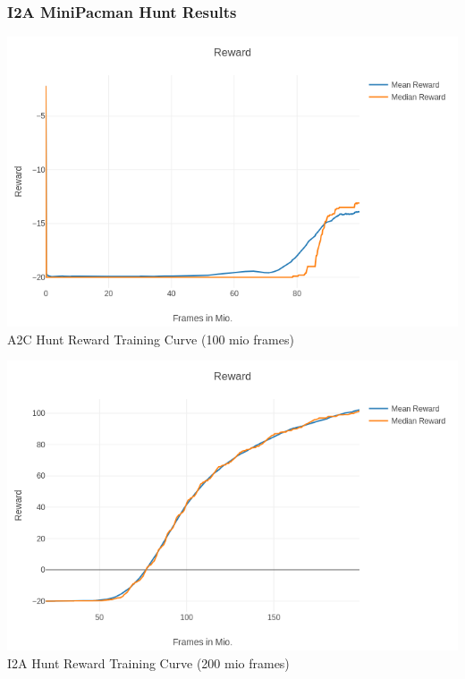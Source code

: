 \begin{frame}
    \frametitle{I2A MiniPacman Hunt Results}

\begin{multicols}{2}
	\begin{center}
    \includegraphics[width=\columnwidth]{./Images/a2c_hunt_reward.png}\\
	A2C Hunt Reward Training Curve (100 mio frames)
	\end{center}
    \vfill\columnbreak
	\begin{center}
    \includegraphics[width=\columnwidth]{./Images/i2a_hunt_reward_mean_and_median.png}\\
	I2A Hunt Reward Training Curve (200 mio frames)
	\end{center}
\end{multicols}
\end{frame}
\clearpage

